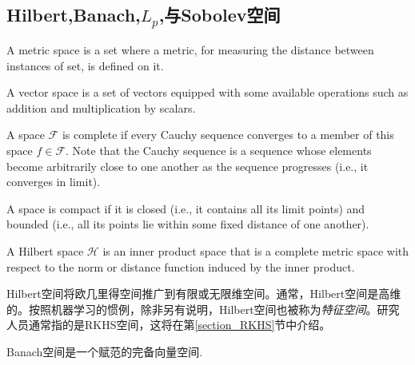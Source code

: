 \documentclass[lang=cn,10pt]{gorgeousnbook}
\numberwithin{equation}{section}%
\numberwithin{figure}{section}%
\begin{document}
\subsection{Hilbert,Banach,$L_p$,与Sobolev空间}\label{section_spaces}

\begin{definition}
A metric space is a set where a metric, for measuring the distance between instances of set, is defined on it. 
\end{definition}

\begin{definition}
A vector space is a set of vectors equipped with some available operations such as addition and multiplication by scalars. 
\end{definition}

\begin{definition}
A space $\mathcal{F}$ is complete if every Cauchy sequence converges to a member of this space $f \in \mathcal{F}$. Note that the Cauchy sequence is a sequence whose elements become arbitrarily close to one another as the sequence progresses (i.e., it converges in limit). 
\end{definition}

\begin{definition}\label{definition_compact_space}
A space is compact if it is closed (i.e., it contains all its limit points) and bounded (i.e., all its points lie within some fixed distance of one another). 
\end{definition}


\begin{definition} \label{definition_Hilbert_space}
A Hilbert space $\mathcal{H}$ is an inner product space that is a complete metric space with respect to the norm or distance function induced by the inner product. 
\end{definition}
Hilbert空间将欧几里得空间推广到有限或无限维空间。通常，Hilbert空间是高维的。按照机器学习的惯例，除非另有说明，Hilbert空间也被称为\textit{特征空间}。研究人员通常指的是RKHS空间，这将在第\ref{section_RKHS}节中介绍。
\begin{definition}
Banach空间是一个赋范的完备向量空间. 
\end{definition}
\end{document}
